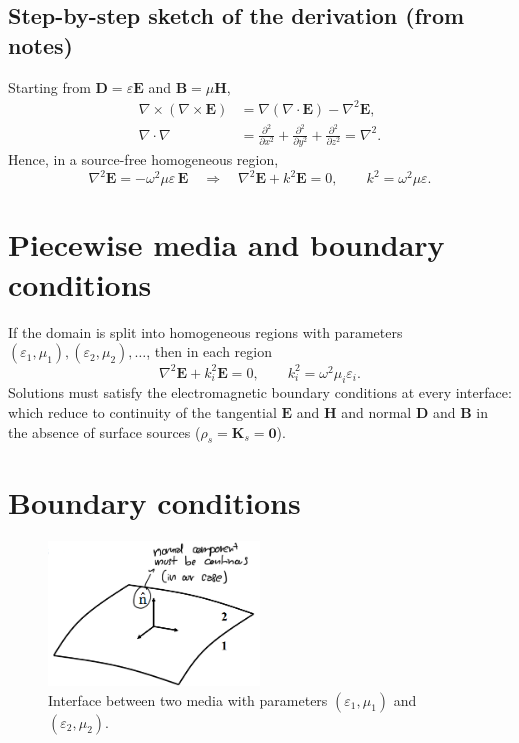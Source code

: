 \subsection*{Step-by-step sketch of the derivation (from notes)}

Starting from $\mathbf{D}=\varepsilon \mathbf{E}$ and $\mathbf{B}=\mu \mathbf{H}$,
\begin{align}
    \nabla\times(\nabla\times \mathbf{E})
    &= \nabla(\nabla\!\cdot\!\mathbf{E})-\nabla^2\mathbf{E},\\
    \nabla\!\cdot\!\nabla &= 
      \frac{\partial^2}{\partial x^2}
    + \frac{\partial^2}{\partial y^2}
    + \frac{\partial^2}{\partial z^2}
    = \nabla^2 .
\end{align}
Hence, in a source-free homogeneous region,
\[
\nabla^2 \mathbf{E} = -\omega^2 \mu \varepsilon\,\mathbf{E}
\quad\Rightarrow\quad
\nabla^2 \mathbf{E} + k^2 \mathbf{E}=0,
\qquad
k^2=\omega^2 \mu \varepsilon .
\]
\section{Piecewise media and boundary conditions}

If the domain is split into homogeneous regions with parameters $(\varepsilon_1,\mu_1),(\varepsilon_2,\mu_2),\dots$, then in each region
\[
\nabla^2 \mathbf{E} + k_i^2 \mathbf{E}=0, \qquad
k_i^2=\omega^2 \mu_i \varepsilon_i .
\]
Solutions must satisfy the electromagnetic boundary conditions at every interface:
which reduce to continuity of the tangential $\mathbf{E}$ and $\mathbf{H}$ and normal $\mathbf{D}$ and $\mathbf{B}$ in the absence of surface sources ($\rho_s=\mathbf{K}_s=\mathbf{0}$).

\section{Boundary conditions}
\begin{figure}[h]
    \centering
    \includegraphics[width=0.5\textwidth]{Pictures/BoundaryConditions.png}
    \caption{Interface between two media with parameters $(\varepsilon_1,\mu_1)$ and $(\varepsilon_2,\mu_2)$.}
\end{figure}

